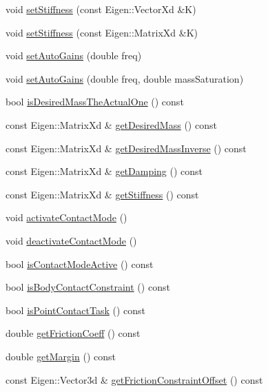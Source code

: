 \begin{DoxyCompactItemize}
\item 
void \hyperlink{classocra_1_1Task_ad4718bcc82babf0a8213740f35fce89c}{set\+Stiffness} (const Eigen\+::\+Vector\+Xd \&K)
\item 
void \hyperlink{classocra_1_1Task_aaa28b24df746182c2288a94fde03c37e}{set\+Stiffness} (const Eigen\+::\+Matrix\+Xd \&K)
\item 
void \hyperlink{classocra_1_1Task_a6d2b2b67112b1368c8bfd7e0ee8e2a0b}{set\+Auto\+Gains} (double freq)
\item 
void \hyperlink{classocra_1_1Task_a310fb246ea58d09d51af965a96d6a628}{set\+Auto\+Gains} (double freq, double mass\+Saturation)
\item 
bool \hyperlink{classocra_1_1Task_affea055b13cfcb3adc0989900e12eb56}{is\+Desired\+Mass\+The\+Actual\+One} () const 
\item 
const Eigen\+::\+Matrix\+Xd \& \hyperlink{classocra_1_1Task_ac07c7b6412393901777abf577bfc7e4e}{get\+Desired\+Mass} () const 
\item 
const Eigen\+::\+Matrix\+Xd \& \hyperlink{classocra_1_1Task_a5c70e46b0de66b732f122899376839fc}{get\+Desired\+Mass\+Inverse} () const 
\item 
const Eigen\+::\+Matrix\+Xd \& \hyperlink{classocra_1_1Task_a52275e8f88b85124cecb7f989697c311}{get\+Damping} () const 
\item 
const Eigen\+::\+Matrix\+Xd \& \hyperlink{classocra_1_1Task_affc64c2638003b79ec691278b0aaa4ce}{get\+Stiffness} () const 
\item 
void \hyperlink{classocra_1_1Task_ab4ad2ba0aaf593bfdc8f78b30b730786}{activate\+Contact\+Mode} ()
\item 
void \hyperlink{classocra_1_1Task_a44fd1aaa1632247ea359af341958c956}{deactivate\+Contact\+Mode} ()
\item 
bool \hyperlink{classocra_1_1Task_a5fb22f623c8bf31a0bbbcb53dff6fba9}{is\+Contact\+Mode\+Active} () const 
\item 
bool \hyperlink{classocra_1_1Task_a0e03c9e39caee016642380f578d77160}{is\+Body\+Contact\+Constraint} () const 
\item 
bool \hyperlink{classocra_1_1Task_ad34b030cdeaf96b74c38a2c9318958fe}{is\+Point\+Contact\+Task} () const 
\item 
double \hyperlink{classocra_1_1Task_a2dcdd270e328aaa40df398ba48fba04a}{get\+Friction\+Coeff} () const 
\item 
double \hyperlink{classocra_1_1Task_ae91b7092529b1aecce3b684ba848db75}{get\+Margin} () const 
\item 
const Eigen\+::\+Vector3d \& \hyperlink{classocra_1_1Task_aa4d74d8925a07411f469d06e231787d7}{get\+Friction\+Constraint\+Offset} () const 

\end{DoxyCompactItemize}
